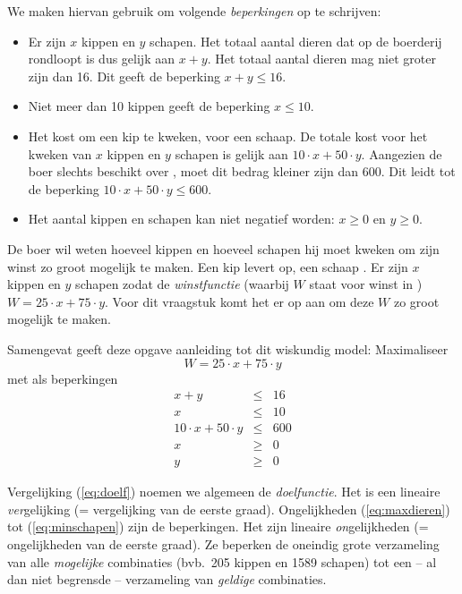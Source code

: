 We maken hiervan gebruik om volgende \textit{beperkingen} op te
schrijven:

\begin{itemize}
    \item  Er zijn $x$ kippen en $y$ schapen. Het totaal aantal dieren dat op de boerderij rondloopt is dus gelijk aan $x+y$. Het totaal aantal dieren mag niet groter zijn dan 16. Dit geeft de beperking  $x+y\leqslant 16$.

    \item  Niet meer dan 10 kippen geeft de beperking  $x\leqslant 10$.

    \item  Het kost  om een kip te kweken,  voor een
schaap. De totale kost voor het kweken van $x$ kippen en $y$ schapen  is gelijk aan 
$10\cdot x+50\cdot y$.  Aangezien de boer slechts beschikt over , moet dit bedrag kleiner zijn dan 600. Dit  leidt tot de beperking $10\cdot x+50\cdot y\leqslant 600$.

    \item  Het aantal kippen en schapen kan niet negatief worden: $x
    \geqslant 0$ en $y \geqslant 0$.
\end{itemize}

De boer wil weten hoeveel kippen en hoeveel schapen hij moet
kweken om zijn winst zo groot mogelijk te maken. Een kip levert
 op, een schaap . Er zijn $x$ kippen en $y$ schapen zodat de \textit{winstfunctie}
(waarbij $W$ staat
voor winst in \euros) $W = 25\cdot x + 75\cdot y$.
Voor dit vraagstuk komt het er op aan om deze $W$ zo groot
mogelijk te maken.

Samengevat geeft deze opgave aanleiding tot dit wiskundig
model:
\noindent
Maximaliseer
\begin{equation}
    W=25\cdot x + 75\cdot y
    \label{eq:doelf}
\end{equation}
met als beperkingen
\begin{eqnarray}
    x+y & \leqslant & 16
    \label{eq:maxdieren}  \\
    x & \leqslant & 10
    \label{eq:maxkippen}  \\
    10\cdot x+50\cdot y& \leqslant & 600
    \label{eq:maxgeld}  \\
    x & \geqslant & 0
    \label{eq:minkippen}  \\
    y & \geqslant & 0
    \label{eq:minschapen}
\end{eqnarray}


Vergelijking (\ref{eq:doelf}) noemen we algemeen de \emph{doelfunctie}.
Het is een lineaire \emph{ver}gelijking
(= vergelijking van de eerste graad).
Ongelijkheden (\ref{eq:maxdieren}) tot (\ref{eq:minschapen}) zijn de beperkingen.
Het zijn lineaire \emph{on}gelijkheden
(= ongelijkheden van de eerste graad). Ze beperken de oneindig
grote verzameling van alle \emph{mogelijke} combinaties (bvb.\ 205
kippen en 1589 schapen) tot een -- al dan niet begrensde -- verzameling
van \emph{geldige} combinaties. 

